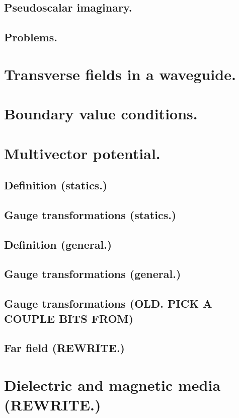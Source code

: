          \subsection{Pseudoscalar imaginary.}
            
         \subsection{Problems.}
            
      \section{Transverse fields in a waveguide.}
         
      \section{Boundary value conditions.}
         
      \section{Multivector potential.}
         \subsection{Definition (statics.)}
            
         \subsection{Gauge transformations (statics.)}
            
         \subsection{Definition (general.)}
            
         \subsection{Gauge transformations (general.)}
            
         \subsection{Gauge transformations (OLD. PICK A COUPLE BITS FROM)}
            
         \subsection{Far field (REWRITE.)}
            
      \section{Dielectric and magnetic media (REWRITE.)}
         
